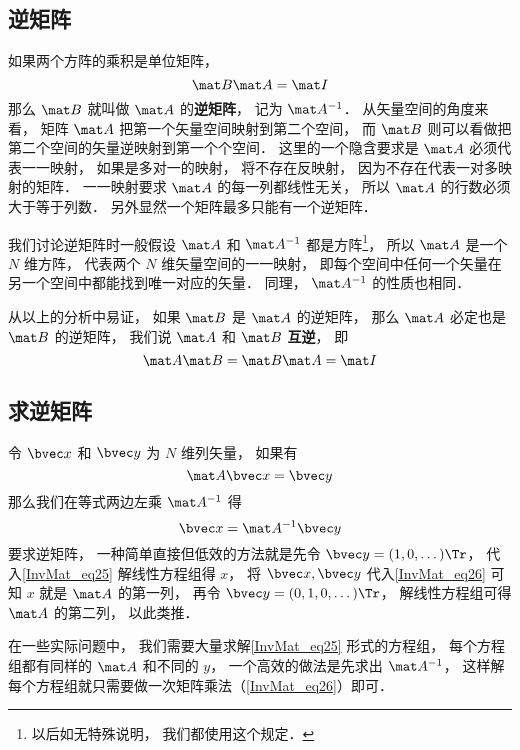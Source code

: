 
\subsection{逆矩阵}

如果两个方阵的乘积是单位矩阵， 
\begin{equation}
\mat B \mat A = \mat I
\end{equation}
那么 $\mat B$ 就叫做 $\mat A$ 的\textbf{逆矩阵}， 记为 $\mat A^{-1}$． 从矢量空间的角度来看， 矩阵 $\mat A$ 把第一个矢量空间映射到第二个空间， 而 $\mat B$ 则可以看做把第二个空间的矢量逆映射到第一个个空间． 这里的一个隐含要求是 $\mat A$ 必须代表一一映射， 如果是多对一的映射， 将不存在反映射， 因为不存在代表一对多映射的矩阵． 一一映射要求 $\mat A$ 的每一列都线性无关，%
所以 $\mat A$ 的行数必须大于等于列数． 另外显然一个矩阵最多只能有一个逆矩阵．

我们讨论逆矩阵时一般假设 $\mat A$ 和 $\mat A^{-1}$ 都是方阵\footnote{以后如无特殊说明， 我们都使用这个规定．}， 所以 $\mat A$ 是一个 $N$ 维方阵， 代表两个 $N$ 维矢量空间的一一映射， 即每个空间中任何一个矢量在另一个空间中都能找到唯一对应的矢量． 同理， $\mat A^{-1}$ 的性质也相同．

从以上的分析中易证， 如果 $\mat B$ 是 $\mat A$ 的逆矩阵， 那么 $\mat A$ 必定也是 $\mat B$ 的逆矩阵， 我们说 $\mat A$ 和 $\mat B$ \textbf{互逆}， 即
\begin{equation}\label{InvMat_eq2}
\mat A \mat B = \mat B \mat A = \mat I
\end{equation}

\subsection{求逆矩阵}
令 $\bvec x$ 和 $\bvec y$ 为 $N$ 维列矢量， 如果有
\begin{equation}\label{InvMat_eq25}
\mat A \bvec x = \bvec y
\end{equation}
那么我们在等式两边左乘 $\mat A^{-1}$ 得
\begin{equation}\label{InvMat_eq26}
\bvec x = \mat A^{-1} \bvec y
\end{equation}
要求逆矩阵， 一种简单直接但低效的方法就是先令 $\bvec y = (1, 0, \dots)\Tr$， 代入\autoref{InvMat_eq25} 解线性方程组得 $x$， 将 $\bvec x, \bvec y$ 代入\autoref{InvMat_eq26} 可知 $x$ 就是 $\mat A$ 的第一列， 再令 $\bvec y = (0, 1, 0, \dots)\Tr$， 解线性方程组可得 $\mat A$ 的第二列， 以此类推．

在一些实际问题中， 我们需要大量求解\autoref{InvMat_eq25} 形式的方程组， 每个方程组都有同样的 $\mat A$ 和不同的 $y$， 一个高效的做法是先求出 $\mat A^{-1}$， 这样解每个方程组就只需要做一次矩阵乘法（\autoref{InvMat_eq26}）即可．




